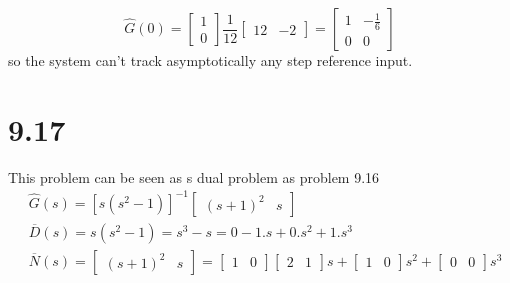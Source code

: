 \documentclass{article}
\begin{document}
\[
    \hat{G}(0)=
    \left[
        \begin{array}{c}
            1\\
            0
        \end{array}
    \right] 
   \frac{1}{12}
    \left[
        \begin{array}{cc}
            12 & -2
        \end{array}
    \right]
=\left[
    \begin{array}{cc}
        1 & -\frac{1}{6}\\
        0 & 0
    \end{array}
\right]
\]
so the system can't track asymptotically any step reference input.

\section*{9.17}
This problem can be seen as s dual problem as problem 9.16
\[
\begin{split}
    &\hat{G}(s)=[s(s^2-1)]^{-1}
    \left[
        \begin{array}{cc}
            (s+1)^2 & s
        \end{array}
    \right]\\
& \overline{D}(s)=s(s^2-1)=s^3-s=0 -1.s+0.s^2+1.s^3\\
& \overline{N}(s)=  \left[
    \begin{array}{cc}
        (s+1)^2 & s
    \end{array}
\right]=\left[
    \begin{array}{cc}
        1 & 0
    \end{array}
\right]
\left[
    \begin{array}{cc}
        2 & 1
    \end{array}
\right]s+
\left[
    \begin{array}{cc}
        1 & 0
    \end{array}
\right]s^2+
\left[
    \begin{array}{cc}
        0 & 0
    \end{array}
\right]s^3
\end{split}    
\]
\end{document}
